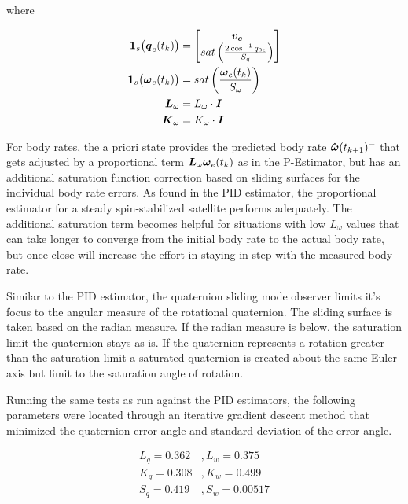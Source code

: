 where

\begin{subequations}
  \begin{align}
    \boldsymbol{1}_s\big(\boldsymbol{q}_{e}(t_k) \big) &= \begin{bmatrix} \boldsymbol{v_e} \\ sat\left( \frac{2\cos^{-1} q_{0e} }{S_{q}} \right) \end{bmatrix} \\
    \boldsymbol{1}_s \big(\boldsymbol{\omega}_e(t_{k}) \big) &= sat\left( \frac{\boldsymbol{\omega}_e(t_{k})}{S_{\omega}} \right) \\
    \boldsymbol{L}_{\omega} &= L_\omega \cdot \boldsymbol{I} \\
    \boldsymbol{K}_{\omega} &= K_\omega \cdot \boldsymbol{I}
  \end{align}
\end{subequations}

For body rates, the a priori state provides the predicted body rate $\boldsymbol{\hat{\omega}}(t_{k+1})^-$ that gets adjusted by a proportional term $\boldsymbol{L}_{\omega} \boldsymbol{\omega}_e(t_{k})$ as in the P-Estimator, but has an additional saturation function correction based on sliding surfaces for the individual body rate errors.  As found in the PID estimator, the proportional estimator for a steady spin-stabilized satellite performs adequately.  The additional saturation term becomes helpful for situations with low $L_\omega$ values that can take longer to converge from the initial body rate to the actual body rate, but once close will increase the effort in staying in step with the measured body rate.

Similar to the PID estimator, the quaternion sliding mode observer limits it's focus to the angular measure of the rotational quaternion.  The sliding surface is taken based on the radian measure.  If the radian measure is below, the saturation limit the quaternion stays as is.  If the quaternion represents a rotation greater than the saturation limit a saturated quaternion is created about the same Euler axis but limit to the saturation angle of rotation.

Running the same tests as run against the PID estimators, the following parameters were located through an iterative gradient descent method that minimized the quaternion error angle and standard deviation of the error angle.

\begin{equation}
  \begin{aligned}
    L_q = 0.362 &, L_w = 0.375 \\
    K_q = 0.308 &, K_w = 0.499 \\
    S_q = 0.419 &, S_w = 0.00517 \\
  \end{aligned}
\end{equation}

